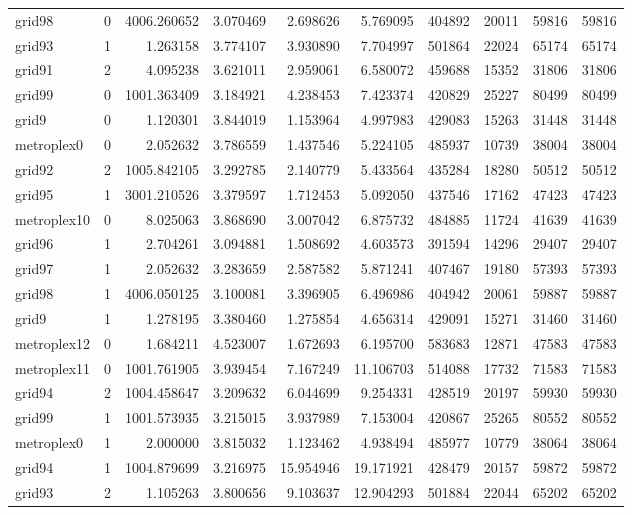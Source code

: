 \documentclass[../../../thesis.tex]{subfiles}
\begin{document}
\begin{longtable}{|l|r|r|r|r|r|r|r|r|r|}
grid98 & 0 & 4006.260652 & 3.070469 & 2.698626 & 5.769095 & 404892 & 20011 & 59816 & 59816 \\
grid93 & 1 & 1.263158 & 3.774107 & 3.930890 & 7.704997 & 501864 & 22024 & 65174 & 65174 \\
grid91 & 2 & 4.095238 & 3.621011 & 2.959061 & 6.580072 & 459688 & 15352 & 31806 & 31806 \\
grid99 & 0 & 1001.363409 & 3.184921 & 4.238453 & 7.423374 & 420829 & 25227 & 80499 & 80499 \\
grid9 & 0 & 1.120301 & 3.844019 & 1.153964 & 4.997983 & 429083 & 15263 & 31448 & 31448 \\
metroplex0 & 0 & 2.052632 & 3.786559 & 1.437546 & 5.224105 & 485937 & 10739 & 38004 & 38004 \\
grid92 & 2 & 1005.842105 & 3.292785 & 2.140779 & 5.433564 & 435284 & 18280 & 50512 & 50512 \\
grid95 & 1 & 3001.210526 & 3.379597 & 1.712453 & 5.092050 & 437546 & 17162 & 47423 & 47423 \\
metroplex10 & 0 & 8.025063 & 3.868690 & 3.007042 & 6.875732 & 484885 & 11724 & 41639 & 41639 \\
grid96 & 1 & 2.704261 & 3.094881 & 1.508692 & 4.603573 & 391594 & 14296 & 29407 & 29407 \\
grid97 & 1 & 2.052632 & 3.283659 & 2.587582 & 5.871241 & 407467 & 19180 & 57393 & 57393 \\
grid98 & 1 & 4006.050125 & 3.100081 & 3.396905 & 6.496986 & 404942 & 20061 & 59887 & 59887 \\
grid9 & 1 & 1.278195 & 3.380460 & 1.275854 & 4.656314 & 429091 & 15271 & 31460 & 31460 \\
metroplex12 & 0 & 1.684211 & 4.523007 & 1.672693 & 6.195700 & 583683 & 12871 & 47583 & 47583 \\
metroplex11 & 0 & 1001.761905 & 3.939454 & 7.167249 & 11.106703 & 514088 & 17732 & 71583 & 71583 \\
grid94 & 2 & 1004.458647 & 3.209632 & 6.044699 & 9.254331 & 428519 & 20197 & 59930 & 59930 \\
grid99 & 1 & 1001.573935 & 3.215015 & 3.937989 & 7.153004 & 420867 & 25265 & 80552 & 80552 \\
metroplex0 & 1 & 2.000000 & 3.815032 & 1.123462 & 4.938494 & 485977 & 10779 & 38064 & 38064 \\
grid94 & 1 & 1004.879699 & 3.216975 & 15.954946 & 19.171921 & 428479 & 20157 & 59872 & 59872 \\
grid93 & 2 & 1.105263 & 3.800656 & 9.103637 & 12.904293 & 501884 & 22044 & 65202 & 65202 \\

\end{longtable}
\end{document}

